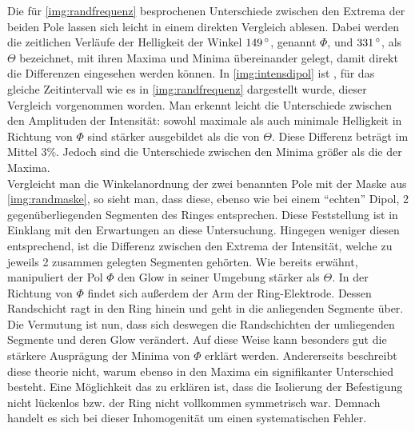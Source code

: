         Die für \autoref{img:randfrequenz} besprochenen Unterschiede zwischen den Extrema der beiden Pole lassen sich leicht in einem direkten Vergleich ablesen. Dabei werden die zeitlichen Verläufe der Helligkeit der Winkel $\unit[149]{\degree}$, genannt $\Phi$, und $\unit[331]{\degree}$, als $\Theta$ bezeichnet, mit ihren Maxima und Minima übereinander gelegt, damit direkt die Differenzen eingesehen werden können. In \autoref{img:intensdipol} ist , für das gleiche Zeitintervall wie es in \autoref{img:randfrequenz} dargestellt wurde, dieser Vergleich vorgenommen worden. Man erkennt leicht die Unterschiede zwischen den Amplituden der Intensität: sowohl maximale als auch minimale Helligkeit in Richtung von $\Phi$ sind stärker ausgebildet als die von $\Theta$. Diese Differenz beträgt im Mittel 3\%. Jedoch sind die Unterschiede zwischen den Minima größer als die der Maxima.\\
        Vergleicht man die Winkelanordnung der zwei benannten Pole mit der Maske aus \autoref{img:randmaske}, so sieht man, dass diese, ebenso wie bei einem "`echten"' Dipol, 2 gegenüberliegenden Segmenten des Ringes entsprechen. Diese Feststellung ist in Einklang mit den Erwartungen an diese Untersuchung. Hingegen weniger diesen entsprechend, ist die Differenz zwischen den Extrema der Intensität, welche zu jeweils 2 zusammen gelegten Segmenten gehörten. Wie bereits erwähnt, manipuliert der Pol $\Phi$ den Glow in seiner Umgebung stärker als $\Theta$. In der Richtung von $\Phi$ findet sich außerdem der Arm der Ring-Elektrode. Dessen Randschicht ragt in den Ring hinein und geht in die anliegenden Segmente über. Die Vermutung ist nun, dass sich deswegen die Randschichten der umliegenden Segmente und deren Glow verändert. Auf diese Weise kann besonders gut die stärkere Ausprägung der Minima von $\Phi$ erklärt werden. Andererseits beschreibt diese theorie nicht, warum ebenso in den Maxima ein signifikanter Unterschied besteht. Eine Möglichkeit das zu erklären ist, dass die Isolierung der Befestigung nicht lückenlos bzw. der Ring nicht vollkommen symmetrisch war. Demnach handelt es sich bei dieser Inhomogenität um einen systematischen Fehler.

